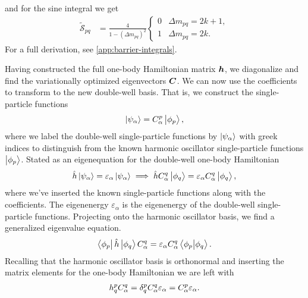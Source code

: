         and for the sine integral we get
        \begin{align}
            \tilde{\mathcal{S}}_{pq}
            &=
            \frac{4}{1 - (\Delta m_{pq})^2}
            \begin{cases}
                0 & \Delta m_{pq} = 2k + 1, \\
                1 & \Delta m_{pq} = 2k.
            \end{cases}
        \end{align}
        For a full derivation, see \autoref{app:barrier-integrals}.

        Having constructed the full one-body Hamiltonian matrix $\boldsymbol{h}$, we
        diagonalize and find the variationally optimized eigenvectors $\boldsymbol{C}$.
        We can now use the coefficients to transform to the new double-well
        basis.
        That is, we construct the single-particle functions
        \begin{align}
            \ket{\psi_{\alpha}} = C^{p}_{\alpha}\ket{\phi_p},
        \end{align}
        where we label the double-well single-particle functions by
        $\ket{\psi_{\alpha}}$ with greek indices to distinguish from the known
        harmonic oscillator single-particle functions $\ket{\phi_p}$.
        Stated as an eigenequation for the double-well one-body Hamiltonian
        \begin{gather}
            \hat{h} \ket{\psi_{\alpha}}
            = \varepsilon_{\alpha} \ket{\psi_{\alpha}}
            \implies
            \hat{h} C^{q}_{\alpha} \ket{\phi_q}
            = \varepsilon_{\alpha} C^{q}_{\alpha} \ket{\phi_q},
        \end{gather}
        where we've inserted the known single-particle functions along with the
        coefficients.
        The eigenenergy $\varepsilon_{\alpha}$ is the eigenenergy of the
        double-well single-particle functions.
        Projecting onto the harmonic oscillator basis, we find a generalized
        eigenvalue equation.
        \begin{gather}
            \bra{\phi_{p}}\hat{h}\ket{\phi_q} C^{q}_{\alpha}
            = \varepsilon_{\alpha} C^{q}_{\alpha} \braket{\phi_{p}}{\phi_{q}}.
        \end{gather}
        Recalling that the harmonic oscillator basis is orthonormal and
        inserting the matrix elements for the one-body Hamiltonian we are left
        with
        \begin{align}
            h^{p}_{q} C^{q}_{\alpha}
            = \delta^{p}_{q} C^{q}_{\alpha} \varepsilon_{\alpha}
            = C^{p}_{\alpha} \varepsilon_{\alpha}.
        \end{align}
